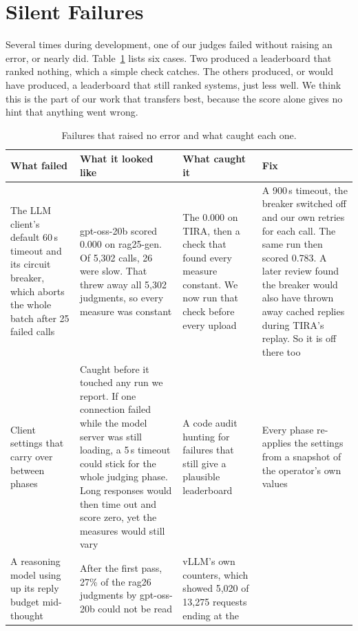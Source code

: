 \section{Silent Failures}
\label{sec:failures}

Several times during development, one of our judges failed without raising an
error, or nearly did. Table~\ref{tab:failures} lists six cases. Two produced a
leaderboard that ranked nothing, which a simple check catches. The others
produced, or would have produced, a leaderboard that still ranked systems, just
less well. We think this is the part of our work that transfers best, because the
score alone gives no hint that anything went wrong.

\begin{table}
  \caption{Failures that raised no error and what caught each one.}
  \label{tab:failures}
  \small
  \begin{tabular}{@{}p{}p{}p{}p{}@{}}
    \toprule
    What failed & What it looked like & What caught it & Fix\\
    \midrule
    The LLM client's default 60\,s timeout and its circuit breaker, which aborts
    the whole batch after 25 failed calls &
    gpt-oss-20b scored 0.000 on rag25-gen. Of 5,302 calls, 26 were slow. That
    threw away all 5,302 judgments, so every measure was constant &
    The 0.000 on TIRA, then a check that found every measure constant. We now run
    that check before every upload &
    A 900\,s timeout, the breaker switched off and our own retries for each call.
    The same run then scored 0.783. A later review found the breaker would
    also have thrown away cached replies during TIRA's replay. So it is off there
    too\\
    \addlinespace
    Client settings that carry over between phases &
    Caught before it touched any run we report. If one connection failed while the
    model server was still loading, a 5\,s timeout could stick for the whole
    judging phase. Long responses would then time out and score zero, yet the
    measures would still vary &
    A code audit hunting for failures that still give a plausible leaderboard &
    Every phase re-applies the settings from a snapshot of the operator's own
    values\\
    \addlinespace
    A reasoning model using up its reply budget mid-thought &
    After the first pass, 27\% of the rag26 judgments by gpt-oss-20b could not be
    read &
    vLLM's own counters, which showed 5,020 of 13,275 requests ending at the

\end{tabular}
\end{table}
